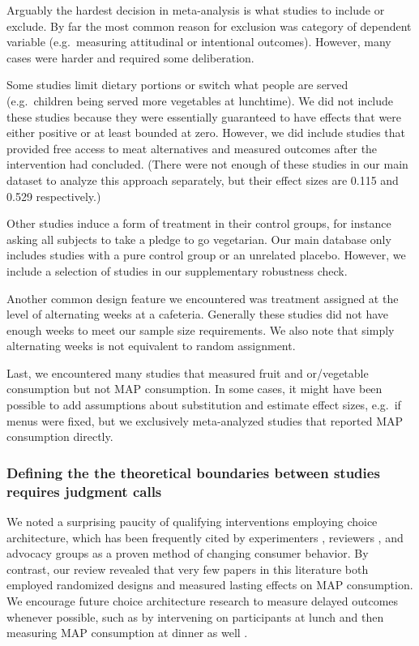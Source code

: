 \documentclass[sn-nature,referee,pdflatex]{sn-jnl}
\begin{document}
Arguably the hardest decision in meta-analysis is what studies to
include or exclude. By far the most common reason for exclusion was
category of dependent variable (e.g.~measuring attitudinal or
intentional outcomes). However, many cases were harder and required some
deliberation.

Some studies limit dietary portions or switch what people are served
(e.g.~children being served more vegetables at lunchtime). We did not
include these studies because they were essentially guaranteed to have
effects that were either positive or at least bounded at zero. However,
we did include studies that provided free access to meat alternatives
\citep{acharya2004, bianchi2022} and measured outcomes after the
intervention had concluded. (There were not enough of these studies in
our main dataset to analyze this approach separately, but their effect
sizes are 0.115 and 0.529 respectively.)

Other studies induce a form of treatment in their control groups, for
instance asking all subjects to take a pledge to go vegetarian. Our main
database only includes studies with a pure control group or an unrelated
placebo. However, we include a selection of studies in our supplementary
robustness check.

Another common design feature we encountered was treatment assigned at
the level of alternating weeks at a cafeteria. Generally these studies
did not have enough weeks to meet our sample size requirements. We also
note that simply alternating weeks is not equivalent to random
assignment.

Last, we encountered many studies that measured fruit and or/vegetable
consumption but not MAP consumption. In some cases, it might have been
possible to add assumptions about substitution and estimate effect
sizes, e.g.~if menus were fixed, but we exclusively meta-analyzed
studies that reported MAP consumption directly.

\subsubsection{Defining the the theoretical boundaries between studies
requires judgment calls}\label{sec5.4.4}

We noted a surprising paucity of qualifying interventions employing
choice architecture, which has been frequently cited by experimenters
\citep{boronowsky2022}, reviewers \citep{meier2022}, and advocacy groups
\citep{zhang2022} as a proven method of changing consumer behavior. By
contrast, our review revealed that very few papers in this literature
both employed randomized designs and measured lasting effects on MAP
consumption. We encourage future choice architecture research to measure
delayed outcomes whenever possible, such as by intervening on
participants at lunch and then measuring MAP consumption at dinner as
well \citep{vocski2024}.
\end{document}

